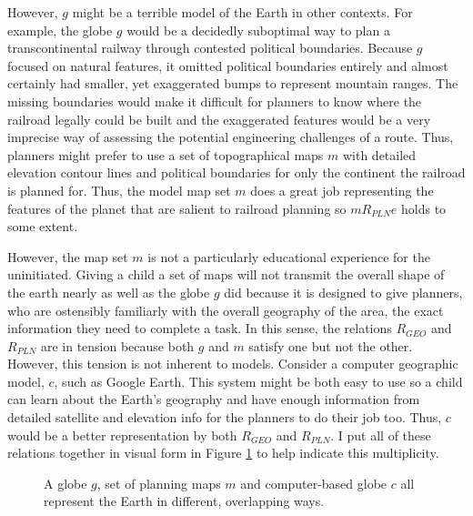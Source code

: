 However, \(g\) might be a terrible model of the Earth in other contexts.
For example, the globe \(g\) would be a decidedly suboptimal way to plan
a transcontinental railway through contested political boundaries.
Because \(g\) focused on natural features, it omitted political
boundaries entirely and almost certainly had smaller, yet exaggerated
bumps to represent mountain ranges. The missing boundaries would make it
difficult for planners to know where the railroad legally could be built
and the exaggerated features would be a very imprecise way of assessing
the potential engineering challenges of a route. Thus, planners might
prefer to use a set of topographical maps \(m\) with detailed elevation
contour lines and political boundaries for only the continent the
railroad is planned for. Thus, the model map set \(m\) does a great job
representing the features of the planet that are salient to railroad
planning so \(mR_{PLN}e\) holds to some extent.

However, the map set \(m\) is not a particularly educational experience
for the uninitiated. Giving a child a set of maps will not transmit the
overall shape of the earth nearly as well as the globe \(g\) did because
it is designed to give planners, who are ostensibly familiarly with the
overall geography of the area, the exact information they need to
complete a task. In this sense, the relations \(R_{GEO}\) and
\(R_{PLN}\) are in tension because both \(g\) and \(m\) satisfy one but
not the other. However, this tension is not inherent to models. Consider
a computer geographic model, \(c\), such as Google Earth. This system
might be both easy to use so a child can learn about the Earth's
geography and have enough information from detailed satellite and
elevation info for the planners to do their job too. Thus, \(c\) would
be a better representation by both \(R_{GEO}\) and \(R_{PLN}\). I put
all of these relations together in visual form in Figure
\ref{fig:globes} to help indicate this multiplicity.

\begin{figure}
    \centering
    \caption{A globe $g$, set of planning maps $m$ and computer-based globe $c$ all represent the Earth in different, overlapping ways.}
    \label{fig:globes}
\end{figure}


